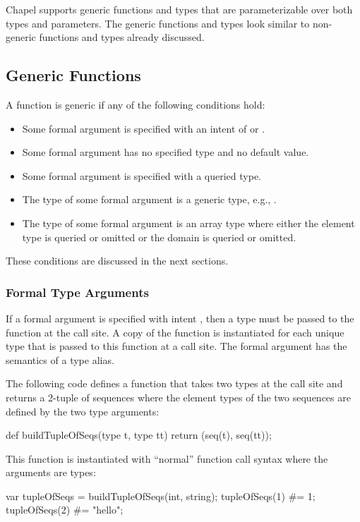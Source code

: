 \label{Generics}

Chapel supports generic functions and types that are parameterizable
over both types and parameters.  The generic functions and types look
similar to non-generic functions and types already discussed.

\subsection{Generic Functions}
\label{Generic_Functions}

A function is generic if any of the following conditions hold:
\begin{itemize}
\item
Some formal argument is specified with an intent of  or
.
\item
Some formal argument has no specified type and no default value.
\item
Some formal argument is specified with a queried type.
\item
The type of some formal argument is a generic type, e.g., .
\item
The type of some formal argument is an array type where either the
element type is queried or omitted or the domain is queried or
omitted.
\end{itemize}
These conditions are discussed in the next sections.

\subsubsection{Formal Type Arguments}
\label{Formal_Type_Arguments}

If a formal argument is specified with intent , then a type
must be passed to the function at the call site.  A copy of the
function is instantiated for each unique type that is passed to this
function at a call site.  The formal argument has the semantics of a
type alias.
\begin{example}
The following code defines a function that takes two types at the call
site and returns a 2-tuple of sequences where the element types of the
two sequences are defined by the two type arguments:
\begin{chapel}
def buildTupleOfSeqs(type t, type tt)
  return (seq(t), seq(tt));
\end{chapel}
This function is instantiated with ``normal'' function call syntax
where the arguments are types:
\begin{chapel}
var tupleOfSeqs = buildTupleOfSeqs(int, string);
tupleOfSeqs(1) #= 1;
tupleOfSeqs(2) #= "hello";
\end{chapel}
\end{example}

